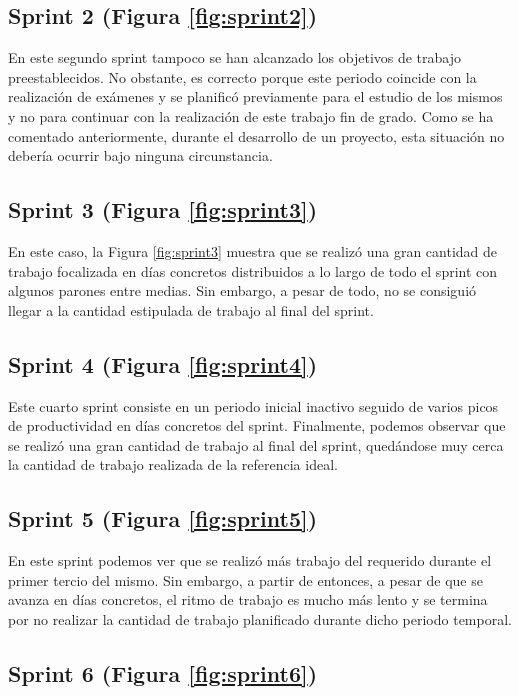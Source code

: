\subsection{Sprint 2 (Figura \ref{fig:sprint2})}

En este segundo sprint tampoco se han alcanzado los objetivos de trabajo preestablecidos. No obstante, es correcto porque este periodo coincide con la realización de exámenes y se planificó previamente para el estudio de los mismos y no para continuar con la realización de este trabajo fin de grado. Como se ha comentado anteriormente, durante el desarrollo de un proyecto, esta situación no debería ocurrir bajo ninguna circunstancia.

\subsection{Sprint 3 (Figura \ref{fig:sprint3})}

En este caso, la Figura \ref{fig:sprint3} muestra que se realizó una gran cantidad de trabajo focalizada en días concretos distribuidos a lo largo de todo el sprint con algunos parones entre medias. Sin embargo, a pesar de todo, no se consiguió llegar a la cantidad estipulada de trabajo al final del sprint.

\subsection{Sprint 4 (Figura \ref{fig:sprint4})}

Este cuarto sprint consiste en un periodo inicial inactivo seguido de varios picos de productividad en días concretos del sprint. Finalmente, podemos observar que se realizó una gran cantidad de trabajo al final del sprint, quedándose muy cerca la cantidad de trabajo realizada de la referencia ideal.

\subsection{Sprint 5 (Figura \ref{fig:sprint5})}

En este sprint podemos ver que se realizó más trabajo del requerido durante el primer tercio del mismo. Sin embargo, a partir de entonces, a pesar de que se avanza en días concretos, el ritmo de trabajo es mucho más lento y se termina por no realizar la cantidad de trabajo planificado durante dicho periodo temporal.

\subsection{Sprint 6 (Figura \ref{fig:sprint6})}

